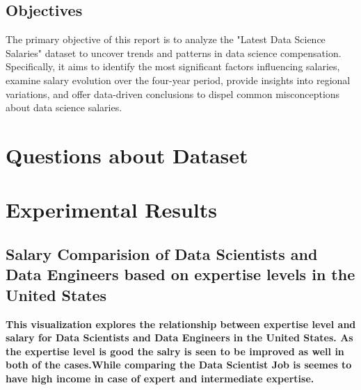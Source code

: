 \documentclass{article}\usepackage[]{graphicx}\usepackage[]{xcolor}
\begin{document}
\subsection{Objectives}
The primary objective of this report is to analyze the "Latest Data Science Salaries" dataset to uncover trends and patterns in data science compensation. Specifically, it aims to identify the most significant factors influencing salaries, examine salary evolution over the four-year period, provide insights into regional variations, and offer data-driven conclusions to dispel common misconceptions about data science salaries.

\newpage
\section{Questions about Dataset}


\newpage
\section{Experimental Results}
\subsection{Salary Comparision of Data Scientists and Data Engineers based on expertise levels in the United States}
\textbf{This visualization explores the relationship between expertise level and salary for Data Scientists and Data Engineers in the United States. As the expertise level is good the salry is seen to be improved as well in both of the cases.While comparing the Data Scientist Job is seemes to have high income in case of expert and intermediate expertise.} 
\end{document}
